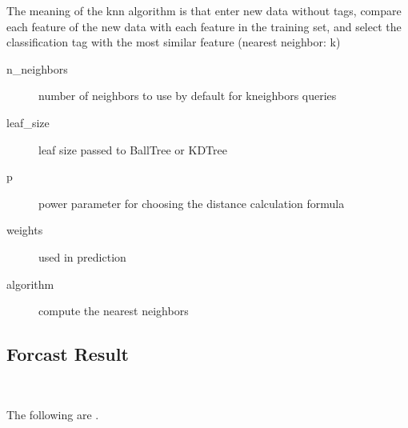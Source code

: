 The meaning of the knn algorithm is that 
enter new data without tags, 
compare each feature of the new data with 
each feature in the training set, 
and select the classification tag with 
the most similar feature (nearest neighbor: k)


\begin{description}
	\item[n_neighbors] number of neighbors to use 
	by default for kneighbors queries
	\item[leaf_size] leaf size passed to BallTree or KDTree
	\item[p] power parameter for choosing 
	the distance calculation formula
	\item[weights] used in prediction
	\item[algorithm] compute the nearest neighbors
\end{description}

	
\subsection{Forcast Result}

\

The following are \DIFdelbegin {}\DIFdelend \DIFaddbegin {}\DIFaddend . 

